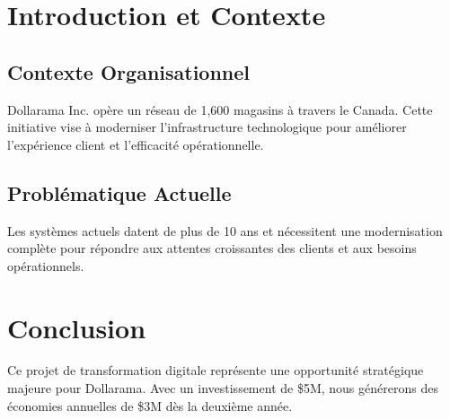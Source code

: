\tableofcontents
\clearpage

\listoftables
\clearpage



\clearpage
{}
\setcounter{page}{1}

\section{Introduction et Contexte}

\subsection{Contexte Organisationnel}

Dollarama Inc. opère un réseau de 1,600 magasins à travers le Canada. Cette initiative vise à moderniser l'infrastructure technologique pour améliorer l'expérience client et l'efficacité opérationnelle.

\subsection{Problématique Actuelle}

Les systèmes actuels datent de plus de 10 ans et nécessitent une modernisation complète pour répondre aux attentes croissantes des clients et aux besoins opérationnels.






\section{Conclusion}

Ce projet de transformation digitale représente une opportunité stratégique majeure pour Dollarama. Avec un investissement de \$5M, nous générerons des économies annuelles de \$3M dès la deuxième année.




